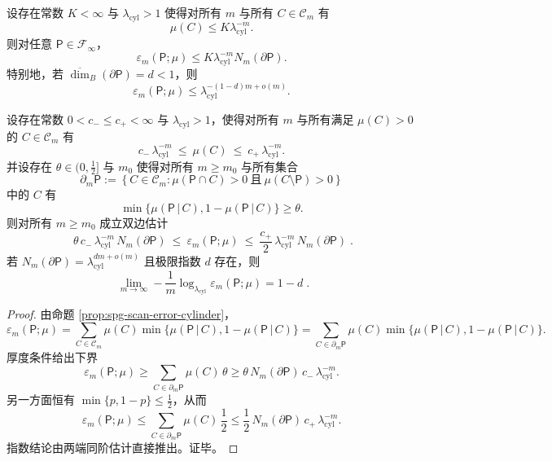 \begin{theorem}[边界维数控制的清晰度收敛]\label{thm:spg-clarity-boundary-dimension}
设存在常数 $K<\infty$ 与 $\lambda_{\mathrm{cyl}}>1$ 使得对所有 $m$ 与所有 $C\in\mathcal{C}_m$ 有
\[
\mu(C)\le K\lambda_{\mathrm{cyl}}^{-m}.
\]
则对任意 $\mathsf P\in\mathcal{F}_\infty$，
\[
\varepsilon_m(\mathsf P;\mu)\le K\lambda_{\mathrm{cyl}}^{-m}N_m(\partial\mathsf P).
\]
特别地，若 $\overline{\dim}_B(\partial\mathsf P)=d<1$，则
\[
\varepsilon_m(\mathsf P;\mu)\le \lambda_{\mathrm{cyl}}^{-(1-d)m+o(m)}.
\]
\end{theorem}

\begin{theorem}\label{thm:spg-clarity-volume-boundary-scaling}
设存在常数 \(0<c_-\le c_+<\infty\) 与 \(\lambda_{\mathrm{cyl}}>1\)，使得对所有 \(m\) 与所有满足 \(\mu(C)>0\) 的 \(C\in\mathcal C_m\) 有
\[
c_-\,\lambda_{\mathrm{cyl}}^{-m}\ \le\ \mu(C)\ \le\ c_+\,\lambda_{\mathrm{cyl}}^{-m}.
\]
并设存在 \(\theta\in(0,\tfrac12]\) 与 \(m_0\) 使得对所有 \(m\ge m_0\) 与所有集合
\[
\partial_m\mathsf P:=\left\{C\in\mathcal C_m:\mu(\mathsf P\cap C)>0\ \text{且}\ \mu(C\setminus \mathsf P)>0\right\}
\]
中的 \(C\) 有
\[
\min\{\mu(\mathsf P\,|\,C),1-\mu(\mathsf P\,|\,C)\}\ge \theta.
\]
则对所有 \(m\ge m_0\) 成立双边估计
\[
\boxed{\;
\theta\,c_-\,\lambda_{\mathrm{cyl}}^{-m}\,N_m(\partial\mathsf P)
\ \le\ \varepsilon_m(\mathsf P;\mu)
\ \le\ \frac{c_+}{2}\,\lambda_{\mathrm{cyl}}^{-m}\,N_m(\partial\mathsf P)\; }.
\]
若 \(N_m(\partial\mathsf P)=\lambda_{\mathrm{cyl}}^{dm+o(m)}\) 且极限指数 \(d\) 存在，则
\[
\boxed{\;
\lim_{m\to\infty}-\frac1m\log_{\lambda_{\mathrm{cyl}}}\varepsilon_m(\mathsf P;\mu)=1-d\; }.
\]
\end{theorem}

\begin{proof}
由命题 \ref{prop:spg-scan-error-cylinder}，
\[
\varepsilon_m(\mathsf P;\mu)
=\sum_{C\in\mathcal C_m}\mu(C)\min\{\mu(\mathsf P\,|\,C),1-\mu(\mathsf P\,|\,C)\}
=\sum_{C\in\partial_m\mathsf P}\mu(C)\min\{\mu(\mathsf P\,|\,C),1-\mu(\mathsf P\,|\,C)\}.
\]
厚度条件给出下界
\[
\varepsilon_m(\mathsf P;\mu)
\ge \sum_{C\in\partial_m\mathsf P}\mu(C)\,\theta
\ge \theta\,N_m(\partial\mathsf P)\,c_-\,\lambda_{\mathrm{cyl}}^{-m}.
\]
另一方面恒有 \(\min\{p,1-p\}\le\tfrac12\)，从而
\[
\varepsilon_m(\mathsf P;\mu)
\le \sum_{C\in\partial_m\mathsf P}\mu(C)\,\frac12
\le \frac12\,N_m(\partial\mathsf P)\,c_+\,\lambda_{\mathrm{cyl}}^{-m}.
\]
指数结论由两端同阶估计直接推出。证毕。
\end{proof}

